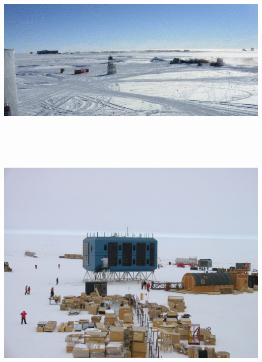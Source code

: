 \Tr
\vspace*{1cm}
\begin{center}
\includegraphics[keepaspectratio,width=25cm]{camp-view}
\end{center}

\Tr
\begin{center}
\includegraphics[keepaspectratio,height=14.5cm]{counting-house}
\end{center}

